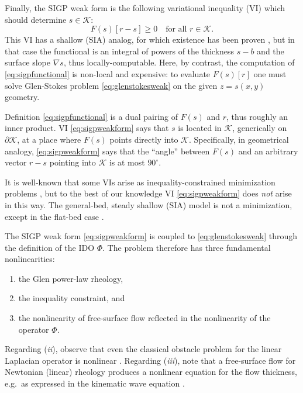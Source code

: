 \documentclass[letterpaper,final,12pt,reqno]{amsart}
\theoremstyle{claim}
\newcommand{\grad}{\nabla}
\numberwithin{equation}{section}
\numberwithin{figure}{section}
\numberwithin{table}{section}
\numberwithin{theorem}{section}
\begin{document}
Finally, the SIGP weak form is the following variational inequality (VI) \cite{KinderlehrerStampacchia1980} which should determine $s\in\mathcal{K}$:
\begin{equation}
F(s)[r - s] \ge 0 \quad \text{for all $r \in \mathcal{K}$.}  \label{eq:sigpweakform}
\end{equation}
This VI has a shallow (SIA) analog, for which existence has been proven \cite{JouvetBueler2012}, but in that case the functional is an integral of powers of the thickness $s-b$ and the surface slope $\grad s$, thus locally-computable.  Here, by contrast, the computation of \eqref{eq:sigpfunctional} is non-local and expensive: to evaluate $F(s)[r]$ one must solve Glen-Stokes problem \eqref{eq:glenstokesweak} on the given $z=s(x,y)$ geometry.

Definition \eqref{eq:sigpfunctional} is a dual pairing of $F(s)$ and $r$, thus roughly an inner product.  VI \eqref{eq:sigpweakform} says that $s$ is located in $\mathcal{K}$, generically on $\partial\mathcal{K}$, at a place where $F(s)$ points directly into $\mathcal{K}$.  Specifically, in geometrical analogy, \eqref{eq:sigpweakform} says that the ``angle'' between $F(s)$ and an arbitrary vector $r-s$ pointing into $\mathcal{K}$ is at most $90^\circ$.

It is well-known that some VIs arise as inequality-constrained minimization problems \cite{GraeserKornhuber2009,KinderlehrerStampacchia1980}, but to the best of our knowledge VI \eqref{eq:sigpweakform} does \emph{not} arise in this way.  The general-bed, steady shallow (SIA) model is not a minimization, except in the flat-bed case \cite{JouvetBueler2012}.

The SIGP weak form \eqref{eq:sigpweakform} is coupled to \eqref{eq:glenstokesweak} through the definition of the IDO $\Phi$.  The problem therefore has three fundamental nonlinearities:
\renewcommand{\labelenumi}{(\emph{\roman{enumi}})}
\begin{enumerate}
\item the Glen power-law rheology,
\item the inequality constraint, and
\item the nonlinearity of free-surface flow reflected in the nonlinearity of the operator $\Phi$.
\end{enumerate}
Regarding (\emph{ii}), observe that even the classical obstacle problem for the linear Laplacian operator is nonlinear \cite{KinderlehrerStampacchia1980}.  Regarding (\emph{iii}), note that a free-surface flow for Newtonian (linear) rheology produces a nonlinear equation for the flow thickness, e.g.~as expressed in the kinematic wave equation \cite{Ockendonetal2003}.
\end{document}

